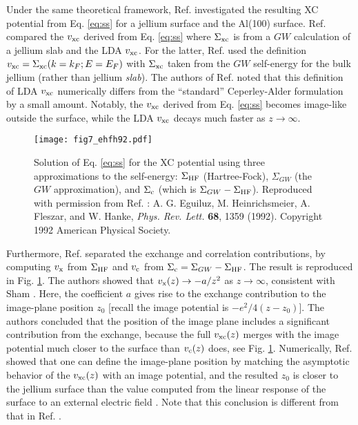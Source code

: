 \documentclass[aip, amsmath, amssymb, reprint, longbibliography]{revtex4-2}
\begin{document}
Under the same theoretical framework, Ref.  investigated the resulting XC potential from Eq. \eqref{eq:ss} for a jellium surface and the Al(100) surface. Ref.  compared the $v_{\rm xc}$ derived from Eq. \eqref{eq:ss} where $\Sigma_{\rm xc}$ is from a $GW$ calculation of a jellium slab and the LDA $v_{\rm xc}$. For the latter, Ref.  used the definition $v_{\rm xc}=\Sigma_{\rm xc}(k=k_F;E=E_F)$ with $\Sigma_{\rm xc}$ taken from the $GW$ self-energy for the bulk jellium (rather than jellium \emph{slab}). The authors of Ref.  noted that this definition of LDA $v_{\rm xc}$ numerically differs from the ``standard'' Ceperley-Alder formulation \cite{CA80} by a small amount. Notably, the $v_{\rm xc}$ derived from Eq. \eqref{eq:ss} becomes image-like outside the surface, while the LDA $v_{\rm xc}$ decays much faster as $z\to\infty$.

\begin{figure}[htp]
\centering
\texttt{[image: fig7\_ehfh92.pdf]}
\caption{Solution of Eq. \eqref{eq:ss} for the XC potential using three approximations to the self-energy: $\Sigma_{\rm HF}$ (Hartree-Fock), $\Sigma_{GW}$ (the $GW$ approximation), and $\Sigma_{\rm c}$ (which is $\Sigma_{GW}-\Sigma_{\rm HF}$). Reproduced with
permission from Ref. : A. G. Eguiluz, M. Heinrichsmeier, A. Fleszar, and W. Hanke, \emph{Phys. Rev. Lett.} \textbf{68}, 1359 (1992). Copyright 1992 American Physical Society.}
\label{fig:ehfh92}
\end{figure}

Furthermore, Ref.  separated the exchange and correlation contributions, by computing $v_{\rm x}$ from $\Sigma_{\rm HF}$ and $v_{\rm c}$ from $\Sigma_{\rm c}=\Sigma_{GW}-\Sigma_{\rm HF}$. The result is reproduced in Fig. \ref{fig:ehfh92}. The authors showed that $v_{\rm x}(z)\to -a/z^2$ as $z\to\infty$, consistent with Sham \cite{S85}. Here, the coefficient $a$ gives rise to the exchange contribution to the image-plane position $z_0$ [recall the image potential is $-e^2/4(z-z_0)$]. The authors concluded that the position of the image plane includes a significant contribution from the exchange, because the full $v_{\rm xc}(z)$ merges with the image potential much closer to the surface than $v_{\rm c}(z)$ does, see Fig. \ref{fig:ehfh92}. Numerically, Ref.  showed that one can define the image-plane position by matching the asymptotic behavior of the $v_{\rm xc}(z)$ with an image potential, and the resulted $z_0$ is closer to the jellium surface than the value computed from the linear response of the surface to an external electric field \cite{LK73,LN93}. Note that this conclusion is different from that in Ref. .
\end{document}
